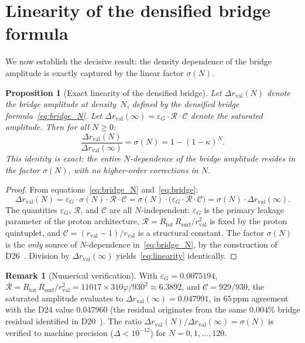 \documentclass[11pt,a4paper]{article}
\newtheorem{proposition}[theorem]{Proposition}
\theoremstyle{definition}
\newtheorem{remark}[theorem]{Remark}
\newcommand{\Rsurf}{R_{\mathrm{surf}}}
\newcommand{\Rtot}{R_{\mathrm{tot}}}
\newcommand{\rval}{r_{\mathrm{val}}}
\newcommand{\epsg}{\varepsilon_G}
\newcommand{\vp}{\varphi}
\newcommand{\kap}{\kappa}
\newcommand{\calC}{\mathcal{C}}
\newcommand{\calR}{\mathcal{R}}
\newcommand{\sig}{\sigma}
\newcommand{\drval}{\Delta r_{\mathrm{val}}}
\begin{document}
\section{Linearity of the densified bridge formula}
\label{sec:linearity}

We now establish the decisive result: the density dependence of the bridge amplitude is exactly captured by the linear factor $\sig(N)$.

\begin{proposition}[Exact linearity of the densified bridge]
\label{prop:linearity}
Let $\drval(N)$ denote the bridge amplitude at density~$N$, defined by the densified bridge formula~\eqref{eq:bridge_N}. Let $\drval(\infty) = \epsg\cdot\calR\cdot\calC$ denote the saturated amplitude. Then for all $N \geq 0$:
\begin{equation}
\frac{\drval(N)}{\drval(\infty)} = \sig(N) = 1-(1-\kap)^N.
\label{eq:linearity}
\end{equation}
This identity is exact: the entire $N$-dependence of the bridge amplitude resides in the factor $\sig(N)$, with no higher-order corrections in $N$.
\end{proposition}

\begin{proof}
From equations~\eqref{eq:bridge_N} and~\eqref{eq:bridge}:
\begin{equation}
\drval(N) = \epsg\cdot\sig(N)\cdot\calR\cdot\calC = \sig(N)\cdot\bigl(\epsg\cdot\calR\cdot\calC\bigr) = \sig(N)\cdot\drval(\infty).
\end{equation}
The quantities $\epsg$, $\calR$, and $\calC$ are all $N$-independent: $\epsg$ is the primary leakage parameter of the proton architecture, $\calR = \Rtot\,\Rsurf/\rval^2$ is fixed by the proton quintuplet, and $\calC = (\rval-1)/\rval$ is a structural constant. The factor $\sig(N)$ is the \emph{only} source of $N$-dependence in~\eqref{eq:bridge_N}, by the construction of D26~\cite{Hubble_PDL_2026}. Division by $\drval(\infty)$ yields~\eqref{eq:linearity} identically.
\end{proof}

\begin{remark}[Numerical verification]
With $\epsg = 0.0075194$, $\calR = \Rtot\,\Rsurf/\rval^2 = 11017\times 310\vp/930^2 \approx 6.3892$, and $\calC = 929/930$, the saturated amplitude evaluates to $\drval(\infty) = 0.047991$, in $65\,\mathrm{ppm}$ agreement with the D24 value $0.047960$ (the residual originates from the same $0.004\%$ bridge residual identified in D20~\cite{Bridge_PDL_2026}). The ratio $\drval(N)/\drval(\infty) = \sig(N)$ is verified to machine precision ($\Delta < 10^{-12}$) for $N = 0, 1, \ldots, 120$.
\end{remark}
\end{document}
